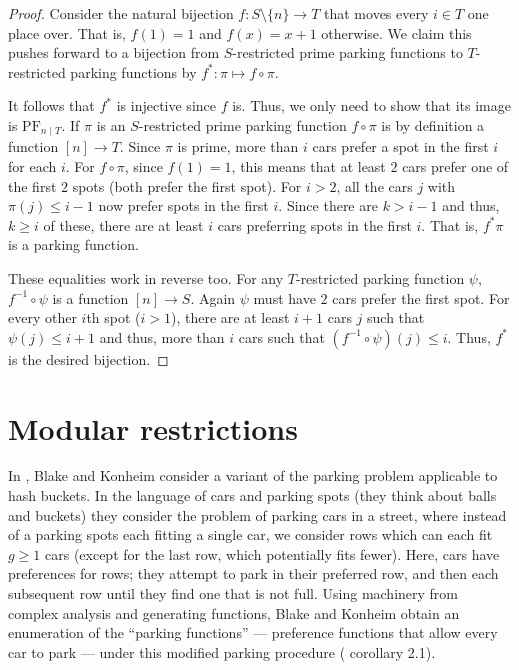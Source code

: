 \documentclass[12 pt]{amsart}
\theoremstyle{definition} %
\theoremstyle{remark} %
\begin{document}
\begin{proof}
	Consider the natural bijection $f : S \setminus \{ n \} \to T$ that moves every $i \in T$ one place over. That is, $f(1) = 1$ and $f(x) = x + 1$ otherwise. We claim this pushes forward to a bijection from $S$-restricted prime parking functions to $T$-restricted parking functions by $f^{*} : \pi \mapsto f \circ \pi$.

	It follows that $f^{*}$ is injective since $f$ is. Thus, we only need to show that its image is $\mathrm{PF}_{n \mid T}$. If $\pi$ is an $S$-restricted prime parking function $f \circ \pi$ is by definition a function $[n] \to T$. Since $\pi$ is prime, more than $i$ cars prefer a spot in the first $i$ for each $i$. For $f \circ \pi$, since $f(1) = 1$, this means that at least $2$ cars prefer one of the first $2$ spots (both prefer the first spot). For $i > 2$, all the cars $j$ with $\pi(j) \le i - 1$ now prefer spots in the first $i$. Since there are $k > i - 1$ and thus, $k \ge i$ of these, there are at least $i$ cars preferring spots in the first $i$. That is, $f^{*} \pi$ is a parking function.

	These equalities work in reverse too. For any $T$-restricted parking function $\psi$, $f^{-1} \circ \psi$ is a function $[n] \to S$. Again $\psi$ must have $2$ cars prefer the first spot. For every other $i$th spot ($i > 1$), there are at least $i + 1$ cars $j$ such that $\psi(j) \le i + 1$ and thus, more than $i$ cars such that $(f^{-1} \circ \psi)(j) \le i$. Thus, $f^{*}$ is the desired bijection.
\end{proof}

\section{Modular restrictions \label{modularsection}}

In \cite{blake-konheim-1977}, Blake and Konheim consider a variant of the parking problem applicable to hash buckets. In the language of cars and parking spots (they think about balls and buckets) they consider the problem of parking cars in a street, where instead of a parking spots each fitting a single car, we consider rows which can each fit $g\ge 1$ cars (except for the last row, which potentially fits fewer). Here, cars have preferences for rows; they attempt to park in their preferred row, and then each subsequent row until they find one that is not full. Using machinery from complex analysis and generating functions, Blake and Konheim obtain an enumeration of the ``parking functions'' --- preference functions that allow every car to park --- under this modified parking procedure (\cite{blake-konheim-1977} corollary 2.1).
\end{document}
